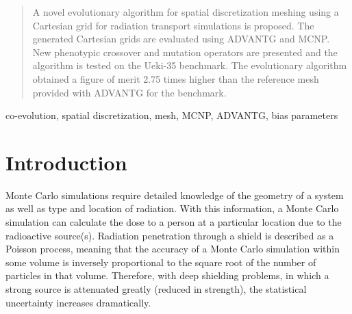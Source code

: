 \documentclass[conference]{IEEEtran}
\begin{document}




\maketitle

\begin{abstract}
A novel evolutionary algorithm for spatial discretization meshing using a Cartesian grid for radiation transport simulations is proposed. The generated Cartesian grids are evaluated using ADVANTG and MCNP. New phenotypic crossover and mutation operators are presented and the algorithm is tested on the Ueki-35 benchmark. The evolutionary algorithm obtained a figure of merit 2.75 times higher than the reference mesh provided with ADVANTG for the benchmark.
\end{abstract}

\begin{IEEEkeywords}
co-evolution, spatial discretization, mesh, MCNP, ADVANTG, bias parameters
\end{IEEEkeywords}

%
\IEEEpeerreviewmaketitle



\section{Introduction}
Monte Carlo simulations require detailed knowledge of the geometry of a system as well as type and location of radiation. With this information, a Monte Carlo simulation can calculate the dose to a person at a particular location due to the radioactive source(s). Radiation penetration through a shield is described as a Poisson process, meaning that the accuracy of a Monte Carlo simulation within some volume is inversely proportional to the square root of the number of particles in that volume. Therefore, with deep shielding problems, in which a strong source is attenuated greatly (reduced in strength), the statistical uncertainty increases dramatically. 
\end{document}
